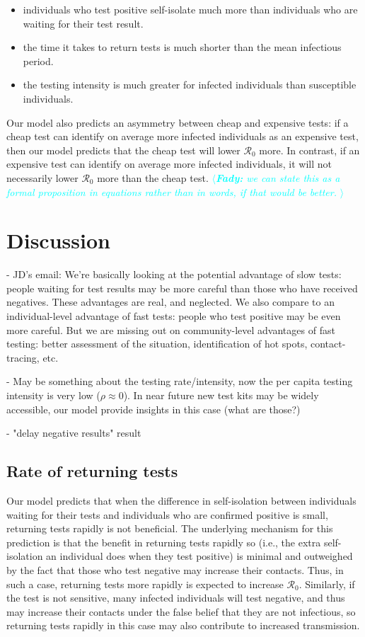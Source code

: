 \documentclass[12pt]{article}
\newcommand{\fady}[1]{\textcolor{cyan}{$\langle${\slshape{\bfseries Fady:} #1 }$\rangle$}}
\newcommand{\Rnum}{\mathcal{R}_0}
\theoremstyle{definition} %
\begin{document}
\begin{itemize}
    \item individuals who test positive self-isolate much more than individuals who are waiting for their test result.
    \item the time it takes to return tests is much shorter than the mean infectious period.
    \item the testing intensity is much greater for infected individuals than susceptible individuals.
\end{itemize}

Our model also predicts an asymmetry between cheap and expensive tests: if a cheap test can identify on average more infected individuals as an expensive test, then our model predicts that the cheap test will lower $\Rnum$ more. In contrast, if an expensive test can identify on average more infected individuals, it will not necessarily lower $\Rnum$ more than the cheap test. \fady{we can state this as a formal proposition in equations rather than in words, if that would be better.}


\section{Discussion}

- JD's email:
We're basically looking at the potential advantage of slow tests:
people waiting for test results may be more careful than those who
have received negatives. These advantages are real, and neglected. We
also compare to an individual-level advantage of fast tests: people
who test positive may be even more careful. But we are missing out on
community-level advantages of fast testing: better assessment of the
situation, identification of hot spots, contact-tracing, etc. 

- May be something about the testing rate/intensity, now the per capita testing intensity is very low ($\rho \approx 0$). In near future new test kits may be widely accessible, our model provide insights in this case (what are those?)

- "delay negative results" result

\subsection{Rate of returning tests}

Our model predicts that when the difference in self-isolation between individuals waiting for their tests and individuals who are confirmed positive is small, returning tests rapidly is not beneficial. The underlying mechanism for this prediction is that the benefit in returning tests rapidly so (i.e., the extra self-isolation an individual does when they test positive) is minimal and outweighed by the fact that those who test negative may increase their contacts. Thus, in such a case, returning tests more rapidly is expected to increase $\Rnum$. Similarly, if the test is not sensitive, many infected individuals will test negative, and thus may increase their contacts under the false belief that they are not infectious, so returning tests rapidly in this case may also contribute to increased transmission.
\end{document}
